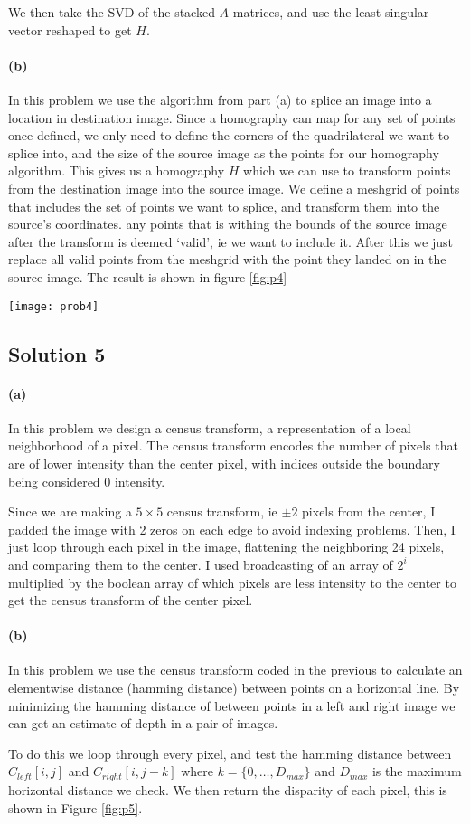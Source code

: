 \documentclass{article}
\newcommand{\solution}[1]{\clearpage \subsection*{Solution #1}}
\newcommand{\spart}[1]{\paragraph{(#1)}}
\begin{document}
We then take the SVD of the stacked $A$ matrices, and use the least singular vector reshaped to get $H$. 

\spart{b} In this problem we use the algorithm from part (a) to splice an image into a location in destination image. Since a homography can map for any set of points once defined, we only need to define the corners of the quadrilateral we want to splice into, and the size of the source image as the points for our homography algorithm. This gives us a homography $H$ which we can use to transform points from the destination image into the source image. We define a meshgrid of points that includes the set of points we want to splice, and transform them into the source's coordinates. any points that is withing the bounds of the source image after the transform is deemed `valid', ie we want to include it. After this we just replace all valid points from the meshgrid with the point they landed on in the source image. The result is shown in figure \ref{fig:p4}

\begin{figure*}[!h]
	\centering
	\texttt{[image: prob4]}
	\caption{Homography Splicing of Two Images}
	\label{fig:p4}
\end{figure*}

\solution{5}

\spart{a} In this problem we design a census transform, a representation of a local neighborhood of a pixel. The census transform encodes the number of pixels that are of lower intensity than the center pixel, with indices outside the boundary being considered 0 intensity. 

Since we are making a $5\times 5$ census transform, ie $\pm2$ pixels from the center, I padded the image with 2 zeros on each edge to avoid indexing problems. Then, I just loop through each pixel in the image, flattening the neighboring 24 pixels, and comparing them to the center. I used broadcasting of an array of $2^i$ multiplied by the boolean array of which pixels are less intensity to the center to get the census transform of the center pixel. 

\spart{b} In this problem we use the census transform coded in the previous to calculate an elementwise distance (hamming distance) between points on a horizontal line. By minimizing the hamming distance of between points in a left and right image we can get an estimate of depth in a pair of images. 

To do this we loop through every pixel, and test the hamming distance between $C_{left}[i,j]$ and $C_{right}[i,j-k]$ where $k=\{0,\dots,D_{max}\} $ and $D_{max}$ is the maximum horizontal distance we check. We then return the disparity of each pixel, this is shown in Figure \ref{fig:p5}.
\end{document}
